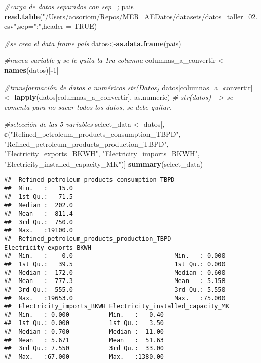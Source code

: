 \documentclass[
]{article}
\newenvironment{Shaded}{\begin{snugshade}}{\end{snugshade}}
\newcommand{\AttributeTok}[1]{\textcolor[rgb]{0.13,0.29,0.53}{#1}}
\newcommand{\CommentTok}[1]{\textcolor[rgb]{0.56,0.35,0.01}{\textit{#1}}}
\newcommand{\ConstantTok}[1]{\textcolor[rgb]{0.56,0.35,0.01}{#1}}
\newcommand{\DecValTok}[1]{\textcolor[rgb]{0.00,0.00,0.81}{#1}}
\newcommand{\FunctionTok}[1]{\textcolor[rgb]{0.13,0.29,0.53}{\textbf{#1}}}
\newcommand{\NormalTok}[1]{#1}
\newcommand{\OtherTok}[1]{\textcolor[rgb]{0.56,0.35,0.01}{#1}}
\newcommand{\SpecialCharTok}[1]{\textcolor[rgb]{0.81,0.36,0.00}{\textbf{#1}}}
\newcommand{\StringTok}[1]{\textcolor[rgb]{0.31,0.60,0.02}{#1}}
\begin{document}
\begin{Shaded}
\begin{Highlighting}[]
\CommentTok{\#carga de datos separados con sep=; }
\NormalTok{pais }\OtherTok{=} \FunctionTok{read.table}\NormalTok{(}\StringTok{"/Users/aosoriom/Repos/MER\_AEDatos/datasets/datos\_taller\_02.csv"}\NormalTok{,}\AttributeTok{sep=}\StringTok{";"}\NormalTok{,}\AttributeTok{header =} \ConstantTok{TRUE}\NormalTok{)}

\CommentTok{\#se crea el data frame país }
\NormalTok{datos}\OtherTok{\textless{}{-}}\FunctionTok{as.data.frame}\NormalTok{(pais) }

\CommentTok{\#nueva variable y se le quita la 1ra columna }
\NormalTok{columnas\_a\_convertir }\OtherTok{\textless{}{-}} \FunctionTok{names}\NormalTok{(datos)[}\SpecialCharTok{{-}}\DecValTok{1}\NormalTok{] }

\CommentTok{\#transformación de datos a numéricos str(Datos)}
\NormalTok{datos[columnas\_a\_convertir] }\OtherTok{\textless{}{-}} \FunctionTok{lapply}\NormalTok{(datos[columnas\_a\_convertir], as.numeric)}
\CommentTok{\# str(datos) {-}{-}\textgreater{} se comenta para no sacar todos los datos, se debe quitar.}

\CommentTok{\#selección de las 5 variables}
\NormalTok{select\_data }\OtherTok{\textless{}{-}}\NormalTok{ datos[, }\FunctionTok{c}\NormalTok{(}\StringTok{"Refined\_petroleum\_products\_consumption\_TBPD"}\NormalTok{, }\StringTok{"Refined\_petroleum\_products\_production\_TBPD"}\NormalTok{, }\StringTok{"Electricity\_exports\_BKWH"}\NormalTok{, }\StringTok{"Electricity\_imports\_BKWH"}\NormalTok{, }\StringTok{"Electricity\_installed\_capacity\_MK"}\NormalTok{)]}
\FunctionTok{summary}\NormalTok{(select\_data)}
\end{Highlighting}
\end{Shaded}

\begin{verbatim}
##  Refined_petroleum_products_consumption_TBPD
##  Min.   :   15.0                            
##  1st Qu.:   71.5                            
##  Median :  202.0                            
##  Mean   :  811.4                            
##  3rd Qu.:  750.0                            
##  Max.   :19100.0                            
##  Refined_petroleum_products_production_TBPD Electricity_exports_BKWH
##  Min.   :    0.0                            Min.   : 0.000          
##  1st Qu.:   39.5                            1st Qu.: 0.000          
##  Median :  172.0                            Median : 0.600          
##  Mean   :  777.3                            Mean   : 5.158          
##  3rd Qu.:  555.0                            3rd Qu.: 5.550          
##  Max.   :19653.0                            Max.   :75.000          
##  Electricity_imports_BKWH Electricity_installed_capacity_MK
##  Min.   : 0.000           Min.   :   0.40                  
##  1st Qu.: 0.000           1st Qu.:   3.50                  
##  Median : 0.700           Median :  11.00                  
##  Mean   : 5.671           Mean   :  51.63                  
##  3rd Qu.: 7.550           3rd Qu.:  33.00                  
##  Max.   :67.000           Max.   :1380.00
\end{verbatim}
\end{document}
